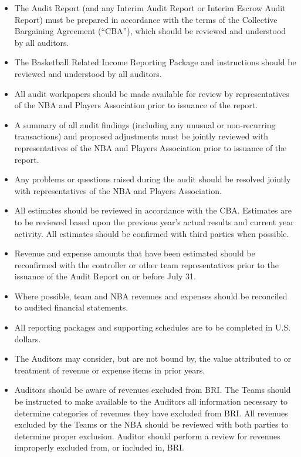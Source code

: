\documentclass[
]{book}
\providecommand{\tightlist}{%
  \setlength{\itemsep}{0pt}\setlength{\parskip}{0pt}}
\begin{document}
\begin{itemize}
\tightlist
\item
  The Audit Report (and any Interim Audit Report or Interim Escrow Audit Report) must be prepared in accordance with the terms of the Collective Bargaining Agreement (``CBA''), which should be reviewed and understood by all auditors.
\item
  The Basketball Related Income Reporting Package and instructions should be reviewed and understood by all auditors.
\item
  All audit workpapers should be made available for review by representatives of the NBA and Players Association prior to issuance of the report.
\item
  A summary of all audit findings (including any unusual or non-recurring transactions) and proposed adjustments must be jointly reviewed with representatives of the NBA and Players Association prior to issuance of the report.
\item
  Any problems or questions raised during the audit should be resolved jointly with representatives of the NBA and Players Association.
\item
  All estimates should be reviewed in accordance with the CBA. Estimates are to be reviewed based upon the previous year's actual results and current year activity. All estimates should be confirmed with third parties when possible.
\item
  Revenue and expense amounts that have been estimated should be reconfirmed with the controller or other team representatives prior to the issuance of the Audit Report on or before July 31.
\item
  Where possible, team and NBA revenues and expenses should be reconciled to audited financial statements.
\item
  All reporting packages and supporting schedules are to be completed in U.S. dollars.
\item
  The Auditors may consider, but are not bound by, the value attributed to or treatment of revenue or expense items in prior years.
\item
  Auditors should be aware of revenues excluded from BRI. The Teams should be instructed to make available to the Auditors all information necessary to determine categories of revenues they have excluded from BRI. All revenues excluded by the Teams or the NBA should be reviewed with both parties to determine proper exclusion. Auditor should perform a review for revenues improperly excluded from, or included in, BRI.
\end{itemize}
\end{document}
